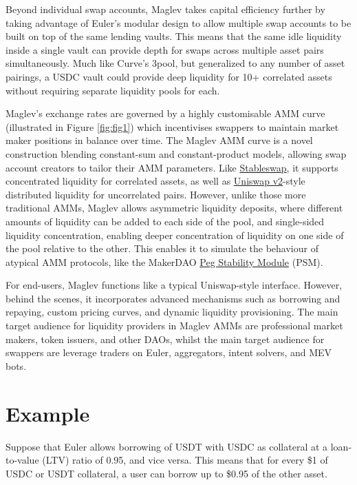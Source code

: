 \documentclass{article}
\begin{document}
Beyond individual swap accounts, Maglev takes capital efficiency further by taking advantage of Euler's modular design to allow multiple swap accounts to be built on top of the same lending vaults. This means that the same idle liquidity inside a single vault can provide depth for swaps across multiple asset pairs simultaneously. Much like Curve’s 3pool, but generalized to any number of asset pairings, a USDC vault could provide deep liquidity for 10+ correlated assets without requiring separate liquidity pools for each.

Maglev’s exchange rates are governed by a highly customisable AMM curve (illustrated in Figure \ref{fig:fig1}) which incentivises swappers to maintain market maker positions in balance over time. The Maglev AMM curve is a novel construction blending constant-sum and constant-product models, allowing swap account creators to tailor their AMM parameters. Like \href{https://berkeley-defi.github.io/assets/material/StableSwap.pdf}{Stableswap}, it supports concentrated liquidity for correlated assets, as well as \href{https://app.uniswap.org/whitepaper.pdf}{Uniswap v2}-style distributed liquidity for uncorrelated pairs. However, unlike those more traditional AMMs, Maglev allows asymmetric liquidity deposits, where different amounts of liquidity can be added to each side of the pool, and single-sided liquidity concentration, enabling deeper concentration of liquidity on one side of the pool relative to the other. This enables it to simulate the behaviour of atypical AMM protocols, like the MakerDAO \href{https://mips.makerdao.com/mips/details/MIP29}{Peg Stability Module} (PSM).

For end-users, Maglev functions like a typical Uniswap-style interface. However, behind the scenes, it incorporates advanced mechanisms such as borrowing and repaying, custom pricing curves, and dynamic liquidity provisioning. The main target audience for liquidity providers in Maglev AMMs are professional market makers, token issuers, and other DAOs, whilst the main target audience for swappers are leverage traders on Euler, aggregators, intent solvers, and MEV bots.  

\section{Example}

Suppose that Euler allows borrowing of USDT with USDC as collateral at a loan-to-value (LTV) ratio of 0.95, and vice versa. This means that for every \$1 of USDC or USDT collateral, a user can borrow up to \$0.95 of the other asset. 
\end{document}
